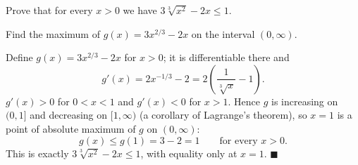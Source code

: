 
\begin{question}
Prove that for every $x>0$ we have $3\sqrt[3]{x^2}-2x\le1$.
\end{question}

\begin{hint}
Find the maximum of $g(x)=3x^{2/3}-2x$ on the interval $(0,\infty)$.
\end{hint}

\begin{solution}
Define $g(x)=3x^{2/3}-2x$ for $x>0$; it is differentiable there and
\[
g'(x)=2x^{-1/3}-2=2\left(\frac{1}{\sqrt[3]x}-1\right).
\]
$g'(x)>0$ for $0<x<1$ and $g'(x)<0$ for $x>1$. Hence $g$ is increasing on $(0,1]$ and decreasing on $[1,\infty)$ (a corollary of Lagrange's theorem), so $x=1$ is a point of absolute maximum of $g$ on $(0,\infty)$:
\[
g(x)\le g(1)=3-2=1\qquad\text{for every }x>0.
\]
This is exactly $3\sqrt[3]{x^2}-2x\le1$, with equality only at $x=1$. $\blacksquare$
\end{solution}
